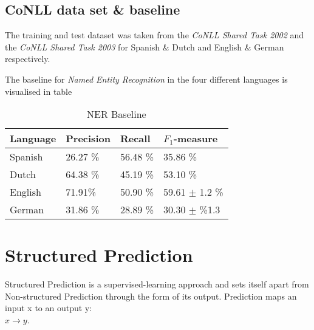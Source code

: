 \documentclass[11pt]{article}
\begin{document}
\subsection*{CoNLL data set \& baseline}
The training and test dataset was taken from the \emph{CoNLL Shared Task 2002} \cite{TjongKimSang:2003:ICS:1119176.1119195} and the \emph{CoNLL Shared Task 2003} \cite{tksintro2002conll}
for Spanish \& Dutch and English \& German respectively.


The baseline for \emph{Named Entity Recognition} in the four different languages is visualised in table \
\begin{table}[h!]
\scriptsize
\begin{tabular}{l|l|l|l}
\hline
\bf Language & \bf Precision & \bf Recall & \bf $F_1$-measure \\ \hline
Spanish &             26.27 \% & 56.48 \% & 35.86  \%        \\
Dutch  &             64.38 \%  &45.19   \%    & 53.10 \%  \\
English &              71.91\%& 50.90 \%  & 59.61 $\pm$ 1.2 \%\\
German &      31.86 \%  & 28.89 \% & 30.30  $\pm$ \%1.3 \\
\end{tabular}
\caption{NER Baseline}
\label{table:Base}
\end{table}

\section{Structured Prediction}
Structured Prediction \cite{strlearn} 
is a supervised-learning approach and sets itself apart from Non-structured Prediction through the form of its output. 
Prediction maps an input x to an output y: \\
$ x \rightarrow y $. 
\end{document}
